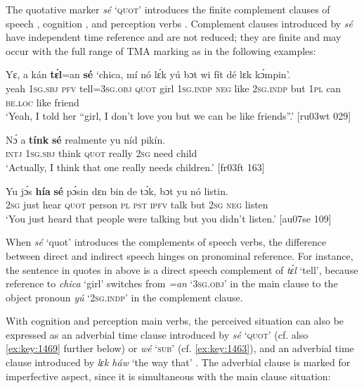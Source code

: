The quotative marker \textit{sé} ‘\textsc{quot}’ introduces the finite complement clauses of speech , cognition , and perception verbs . Complement clauses introduced by \textit{sé} have independent time reference and are not reduced; they are finite and may occur with the full range of \textsc{TMA} marking as in the following examples: 



\ea%
    \label{ex:key:1405}
    \gll Yɛ,    a    kán  \textbf{tɛ́l}=an    \textbf{sé}    ‘chica,  mí    nó  lɛ́k  yú
bɔt  wi  fít  dé    lɛk  kɔ́mpin’.\\
yeah  \textsc{1sg.sbj}  \textsc{pfv}  tell=\textsc{3sg.obj}  \textsc{quot}    girl    \textsc{1sg.indp}  \textsc{neg}  like  \textsc{2sg.indp}
but  \textsc{1pl}  can  \textsc{be.loc}  like  friend\\

\glt ‘Yeah, I told her “girl, I don’t love you but we can be like friends”.’ [ru03wt 029]
\z


\ea%
    \label{ex:key:1406}
    \gll Nɔ́  a    \textbf{tínk}    \textbf{sé}    realmente  yu  níd    pikín.\\
\textsc{intj}  \textsc{1sg.sbj}  think  \textsc{quot}    really    \textsc{2sg}  need  child\\

\glt ‘Actually, I think that one really needs children.’ [fr03ft 163]
\z


\ea%
    \label{ex:key:1407}
    \gll Yu  jɔ́s  \textbf{hía}    \textbf{sé}    pɔ́sin  dɛn  bin  de  tɔ́k,  bɔt  yu  nó  listin.\\
\textsc{2sg}  just  hear    \textsc{quot}    person  \textsc{pl}  \textsc{pst}  \textsc{ipfv}  talk  but  \textsc{2sg}  \textsc{neg}  listen\\

\glt ‘You just heard that people were talking but you didn’t listen.’ [au07se 109]
\z

When \textit{sé} ‘quot’ introduces the complements of speech verbs, the difference between direct and indirect speech{\fff} hinges on pronominal reference. For instance, the sentence in quotes in  above is a direct speech {\fff}complement of \textit{tɛ́l} ‘tell’, because reference to \textit{chica} ‘girl’ switches from \textit{=an} ‘\textsc{3sg.obj}’ in the main clause to the object pronoun \textit{yú} ‘\textsc{2sg.indp}’ in the complement clause.


With cognition and perception main verbs, the perceived situation can also be expressed as an adverbial time clause introduced by \textit{sé} ‘\textsc{quot}’  (cf. also \ref{ex:key:1469} further below) or \textit{wé} ‘\textsc{sub}’ (cf. \ref{ex:key:1463}), and an adverbial time clause introduced by \textit{lɛk háw} ‘the way that’ . The adverbial clause is marked for imperfective aspect, since it is simultaneous with the main clause situation: 



